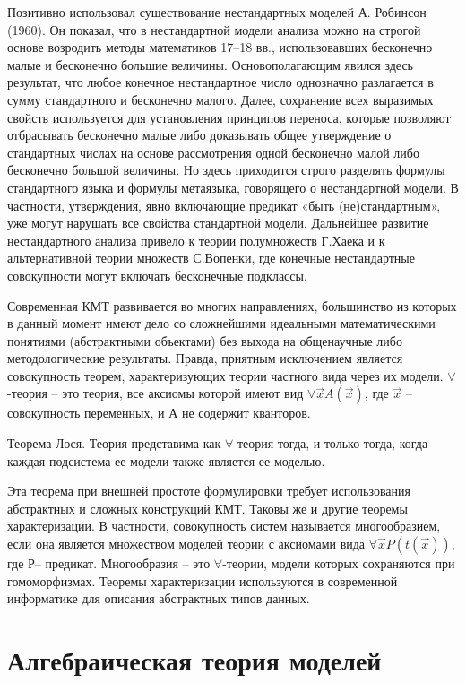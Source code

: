 \documentclass[12pt, a4paper]{article}
\begin{document}
Позитивно использовал существование нестандартных моделей А. Робинсон (1960). Он показал, что в
нестандартной модели анализа можно на строгой основе возродить методы математиков 17–18 вв.,
использовавших бесконечно малые и бесконечно большие величины. Основополагающим явился здесь
результат, что любое конечное нестандартное число однозначно разлагается в сумму стандартного и
бесконечно малого. Далее, сохранение всех выразимых свойств используется для установления
принципов переноса, которые позволяют отбрасывать бесконечно малые либо доказывать общее
утверждение о стандартных числах на основе рассмотрения одной бесконечно малой либо бесконечно
большой величины. Но здесь приходится строго разделять формулы стандартного языка и формулы
метаязыка, говорящего о нестандартной модели. В частности, утверждения, явно включающие
предикат «быть (не)стандартным», уже могут нарушать все свойства стандартной модели. Дальнейшее
развитие нестандартного анализа привело к теории полумножеств Г.Хаека и к альтернативной теории
множеств С.Вопенки, где конечные нестандартные совокупности могут включать бесконечные
подклассы.

Современная КМТ развивается во многих направлениях, большинство из которых в данный момент
имеют дело со сложнейшими идеальными математическими понятиями (абстрактными объектами)
без выхода на общенаучные либо методологические результаты. Правда, приятным исключением
является совокупность теорем, характеризующих теории частного вида через их модели. $\forall$-теория –
это теория, все аксиомы которой имеют вид $\forall \overrightarrow{x} A\left(\overrightarrow{x}\right)$, где $\overrightarrow{x}$ – совокупность переменных, и А не
содержит кванторов.

Теорема Лося. Теория представима как $\forall$-теория тогда, и только тогда, когда каждая подсистема ее
модели также является ее моделью.

Эта теорема при внешней простоте формулировки требует использования абстрактных и сложных
конструкций КМТ. Таковы же и другие теоремы характеризации. В частности, совокупность систем
называется многообразием, если она является множеством моделей теории с аксиомами вида $\forall \overrightarrow{x} P\left(t\left(\overrightarrow{x}\right)\right)$, где Р– предикат. Многообразия – это $\forall$-теории, модели которых сохраняются при гомоморфизмах.
Теоремы характеризации используются в современной информатике для описания абстрактных типов
данных.

\section{Алгебраическая теория моделей}
\end{document}
